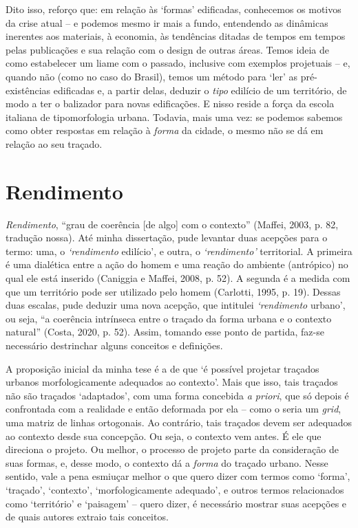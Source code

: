 \documentclass[12pt, a4paper]{book} %
\begin{document}
            Dito isso, reforço que: em relação às `formas' edificadas, conhecemos os motivos da crise atual  – e podemos mesmo ir mais a fundo, entendendo as dinâmicas inerentes aos materiais, à economia, às tendências ditadas de tempos em tempos pelas publicações e sua relação com o design de outras áreas. Temos ideia de como estabelecer um liame com o passado, inclusive com exemplos projetuais – e, quando não (como no caso do Brasil), temos um método para `ler' as pré-existências edificadas e, a partir delas, deduzir o \textit{tipo} edilício de um território, de modo a ter o balizador para novas edificações. E nisso reside a força da escola italiana de tipomorfologia urbana. Todavia, mais uma vez: se podemos sabemos como obter respostas em relação à \textit{forma} da cidade, o mesmo não se dá em relação ao seu traçado.

            \section{Rendimento}%
            
            \textit{Rendimento}, ``grau de coerência [de algo] com o contexto'' (Maffei, 2003, p. 82, tradução nossa).  Até minha dissertação, pude levantar duas acepções para o termo: uma, o \textit{`rendimento} edilício', e outra, o \textit{`rendimento'} territorial. A primeira é uma dialética entre a ação do homem e uma reação do ambiente (antrópico) no qual ele está inserido (Caniggia e Maffei, 2008, p. 52). A segunda é a medida com que um território pode ser utilizado pelo homem (Carlotti, 1995, p. 19). Dessas duas escalas, pude deduzir uma nova acepção, que intitulei \textit{`rendimento} urbano', ou seja, ``a coerência intrínseca entre o traçado da forma urbana e o contexto natural'' (Costa, 2020, p. 52). Assim, tomando esse ponto de partida, faz-se necessário destrinchar alguns conceitos e definições.

            A proposição inicial da minha tese é a de que `é possível projetar traçados urbanos morfologicamente adequados ao contexto'. Mais que isso, tais traçados não são traçados `adaptados', com uma forma concebida \textit{a priori}, que só depois é confrontada com a realidade e então deformada por ela – como o seria um \textit{grid}, uma matriz de linhas ortogonais. Ao contrário, tais traçados devem ser adequados ao contexto desde sua concepção. Ou seja, o contexto vem antes. É ele que direciona o projeto. Ou melhor, o processo de projeto parte da consideração de suas formas, e, desse modo, o contexto dá a \textit{forma} do traçado urbano. Nesse sentido, vale a pena esmiuçar melhor o que quero dizer com termos como `forma', `traçado', `contexto', `morfologicamente adequado', e outros termos relacionados como `território' e `paisagem' – quero dizer, é necessário mostrar suas acepções e de quais autores extraio tais conceitos.
\end{document}
